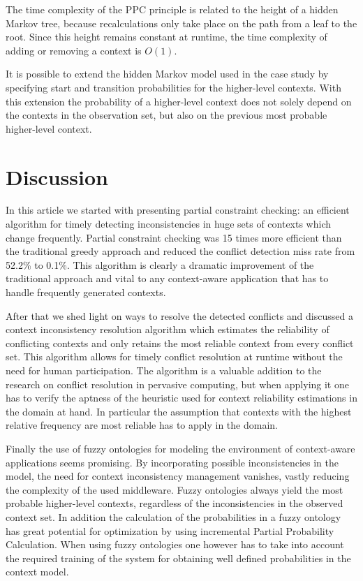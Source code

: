 \documentclass[journal]{vgtc}                %
\begin{document}
The time complexity of the PPC principle is related to the height of a hidden Markov tree, because recalculations only take place on the path from a leaf to the root. Since this height remains constant at runtime, the time complexity of adding or removing a context is $O(1)$.

It is possible to extend the hidden Markov model used in the case study by specifying start and transition probabilities for the higher-level contexts. With this extension the probability of a higher-level context does not solely depend on the contexts in the observation set, but also on the previous most probable higher-level context.

\section{Discussion}
In this article we started with presenting partial constraint checking: an efficient algorithm for timely detecting inconsistencies in huge sets of contexts which change frequently. Partial constraint checking was 15 times more efficient than the traditional greedy approach and reduced the conflict detection miss rate from 52.2\% to 0.1\%. This algorithm is clearly a dramatic improvement of the traditional approach and vital to any context-aware application that has to handle frequently generated contexts.

After that we shed light on ways to resolve the detected conflicts and discussed a context inconsistency resolution algorithm which estimates the reliability of conflicting contexts and only retains the most reliable context from every conflict set. This algorithm allows for timely conflict resolution at runtime without the need for human participation. The algorithm is a valuable addition to the research on conflict resolution in pervasive computing, but when applying it one has to verify the aptness of the heuristic used for context reliability estimations in the domain at hand. In particular the assumption that contexts with the highest relative frequency are most reliable has to apply in the domain.

Finally the use of fuzzy ontologies for modeling the environment of context-aware applications seems promising. By incorporating possible inconsistencies in the model, the need for context inconsistency management vanishes, vastly reducing the complexity of the used middleware. Fuzzy ontologies always yield the most probable higher-level contexts, regardless of the inconsistencies in the observed context set. In addition the calculation of the probabilities in a fuzzy ontology has great potential for optimization by using incremental Partial Probability Calculation. 
When using fuzzy ontologies one however has to take into account the required training of the system for obtaining well defined probabilities in the context model. 
\end{document}
